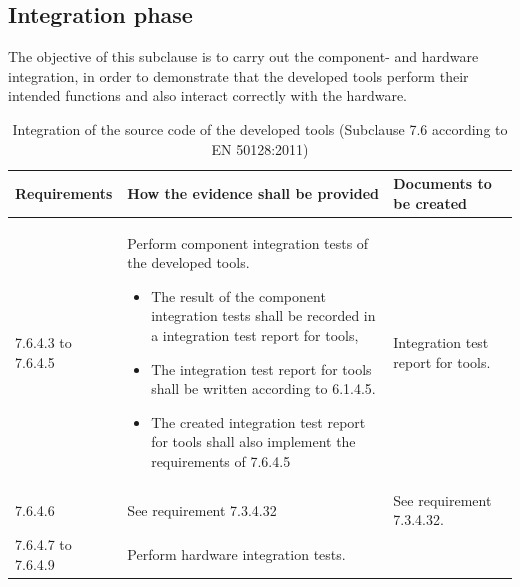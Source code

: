 \documentclass{template/openetcs_report}
\begin{document}
\subsection{Integration phase}
\begin{flushleft}
The objective of this subclause is to carry out the component- and hardware integration, in order to demonstrate that the developed tools perform their intended functions and also interact correctly with the hardware.
\end{flushleft}
{\footnotesize\sffamily\centering
\begin{longtable}{|p{2cm}|p{9cm}|p{3cm}|}
\caption{Integration of the source code of the developed tools (Subclause 7.6 according to EN 50128:2011)}\\
\hline
\bfseries Requirements & \bfseries How the evidence shall be provided & \bfseries Documents to be created\\
\hline
\hline
\endhead
\hline
\endfoot

7.6.4.3 to 7.6.4.5 & Perform component integration tests of the developed tools.

\begin{itemize}\itemsep=0pt
  \item The result of the component integration tests shall be recorded in a integration test report for tools,
  \item The integration test report for tools shall be written according to 6.1.4.5. 
  \item The created integration test report for tools shall also implement the requirements of 7.6.4.5 
\end{itemize}
& Integration test report for tools.\\ 
\hline
7.6.4.6 & See requirement 7.3.4.32 & See requirement 7.3.4.32.\\ 
\hline
7.6.4.7 to 7.6.4.9 & Perform hardware integration tests.


\end{longtable}}
\end{document}
